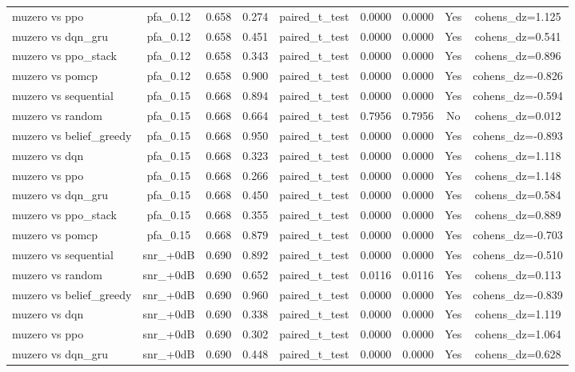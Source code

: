 \begin{table}[htbp]
\begin{tabular}{lcccccccc}
muzero vs ppo & pfa_0.12 & 0.658 & 0.274 & paired_t_test & 0.0000 & 0.0000 & Yes & cohens_dz=1.125 \\
muzero vs dqn_gru & pfa_0.12 & 0.658 & 0.451 & paired_t_test & 0.0000 & 0.0000 & Yes & cohens_dz=0.541 \\
muzero vs ppo_stack & pfa_0.12 & 0.658 & 0.343 & paired_t_test & 0.0000 & 0.0000 & Yes & cohens_dz=0.896 \\
muzero vs pomcp & pfa_0.12 & 0.658 & 0.900 & paired_t_test & 0.0000 & 0.0000 & Yes & cohens_dz=-0.826 \\
muzero vs sequential & pfa_0.15 & 0.668 & 0.894 & paired_t_test & 0.0000 & 0.0000 & Yes & cohens_dz=-0.594 \\
muzero vs random & pfa_0.15 & 0.668 & 0.664 & paired_t_test & 0.7956 & 0.7956 & No & cohens_dz=0.012 \\
muzero vs belief_greedy & pfa_0.15 & 0.668 & 0.950 & paired_t_test & 0.0000 & 0.0000 & Yes & cohens_dz=-0.893 \\
muzero vs dqn & pfa_0.15 & 0.668 & 0.323 & paired_t_test & 0.0000 & 0.0000 & Yes & cohens_dz=1.118 \\
muzero vs ppo & pfa_0.15 & 0.668 & 0.266 & paired_t_test & 0.0000 & 0.0000 & Yes & cohens_dz=1.148 \\
muzero vs dqn_gru & pfa_0.15 & 0.668 & 0.450 & paired_t_test & 0.0000 & 0.0000 & Yes & cohens_dz=0.584 \\
muzero vs ppo_stack & pfa_0.15 & 0.668 & 0.355 & paired_t_test & 0.0000 & 0.0000 & Yes & cohens_dz=0.889 \\
muzero vs pomcp & pfa_0.15 & 0.668 & 0.879 & paired_t_test & 0.0000 & 0.0000 & Yes & cohens_dz=-0.703 \\
muzero vs sequential & snr_+0dB & 0.690 & 0.892 & paired_t_test & 0.0000 & 0.0000 & Yes & cohens_dz=-0.510 \\
muzero vs random & snr_+0dB & 0.690 & 0.652 & paired_t_test & 0.0116 & 0.0116 & Yes & cohens_dz=0.113 \\
muzero vs belief_greedy & snr_+0dB & 0.690 & 0.960 & paired_t_test & 0.0000 & 0.0000 & Yes & cohens_dz=-0.839 \\
muzero vs dqn & snr_+0dB & 0.690 & 0.338 & paired_t_test & 0.0000 & 0.0000 & Yes & cohens_dz=1.119 \\
muzero vs ppo & snr_+0dB & 0.690 & 0.302 & paired_t_test & 0.0000 & 0.0000 & Yes & cohens_dz=1.064 \\
muzero vs dqn_gru & snr_+0dB & 0.690 & 0.448 & paired_t_test & 0.0000 & 0.0000 & Yes & cohens_dz=0.628 \\

\end{tabular}
\end{table}
